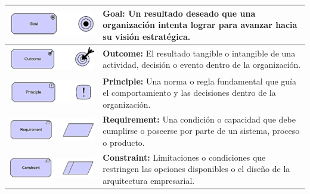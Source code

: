 \begin{longtable}{|c|p{8cm}|}
\hline
\includegraphics{anexos/ARCHI/strategy/goal.png} & 
\textbf{Goal:} Un resultado deseado que una organización intenta lograr para avanzar hacia su visión estratégica. \\
\hline
\includegraphics{anexos/ARCHI/strategy/outcome.png} & 
\textbf{Outcome:} El resultado tangible o intangible de una actividad, decisión o evento dentro de la organización. \\
\hline
\includegraphics{anexos/ARCHI/strategy/principle.png} & 
\textbf{Principle:} Una norma o regla fundamental que guía el comportamiento y las decisiones dentro de la organización. \\
\hline
\includegraphics{anexos/ARCHI/strategy/requirement.png} & 
\textbf{Requirement:} Una condición o capacidad que debe cumplirse o poseerse por parte de un sistema, proceso o producto. \\
\hline
\includegraphics{anexos/ARCHI/strategy/constraint.png} & 
\textbf{Constraint:} Limitaciones o condiciones que restringen las opciones disponibles o el diseño de la arquitectura empresarial. \\

\end{longtable}
